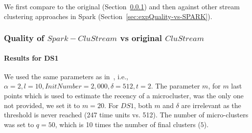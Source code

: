 We first compare \our to the original \clustream (Section~\ref{sec:expQuality-vs-CluStream}) and then against other stream clustering approaches in Spark (Section~\ref{sec:expQuality-vs-SPARK}).

\subsubsection{Quality of $Spark-CluStream$ vs original $CluStream$}
\label{sec:expQuality-vs-CluStream}
\paragraph{Results for DS1}
We used the same parameters as in~\cite{clustreamOrig}, i.e., $\alpha=2,l=10,InitNumber=2,000,\delta=512,t=2$.
The parameter $m$, for $m$ last points which is used to estimate the recency of a microcluster, was the only one not provided, we set it to $m=20$. 
For $DS1$, both $m$ and $\delta$ are irrelevant as the threshold is never reached (247 time units vs. 512). 
The number of micro-clusters was set to $q=50$, which is 10 times the number of final clusters ($5$). 

